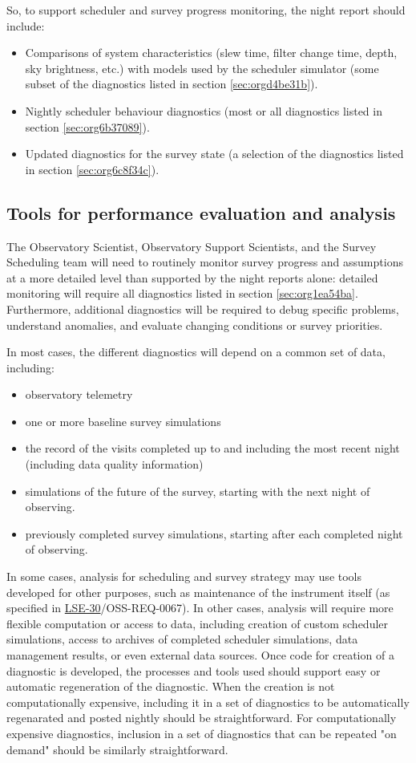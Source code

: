 So, to support scheduler and survey progress monitoring, the night report should include:
\begin{itemize}
\item Comparisons of system characteristics (slew time, filter change time, depth, sky brightness, etc.) with models used by the scheduler simulator (some subset of the diagnostics listed in section \ref{sec:orgd4be31b}).
\item Nightly scheduler behaviour diagnostics (most or all diagnostics listed in section \ref{sec:org6b37089}).
\item Updated diagnostics for the survey state (a selection of the diagnostics listed in section \ref{sec:org6c8f34c}).
\end{itemize}

\subsection{Tools for performance evaluation and analysis}
\label{sec:org032ab78}
The Observatory Scientist, Observatory Support Scientists, and the Survey Scheduling team will need to routinely monitor survey progress and assumptions at a more detailed level than supported by the night reports alone:
detailed monitoring will require all diagnostics listed in section \ref{sec:org1ea54ba}.
Furthermore, additional diagnostics will be required to debug specific problems, understand anomalies, and evaluate changing conditions or survey priorities.

In most cases, the different diagnostics will depend on a common set of data, including:
\begin{itemize}
\item observatory telemetry
\item one or more baseline survey simulations
\item the record of the visits completed up to and including the most recent night (including data quality information)
\item simulations of the future of the survey, starting with the next night of observing.
\item previously completed survey simulations, starting after each completed night of observing.
\end{itemize}

In some cases, analysis for scheduling and survey strategy may use tools developed for other purposes, such as maintenance of the instrument itself (as specified in \href{https://ls.st/lse-30}{LSE-30}/OSS-REQ-0067).
In other cases, analysis will require more flexible computation or access to data, including creation of custom scheduler simulations, access to archives of completed scheduler simulations, data management results, or even external data sources.
Once code for creation of a diagnostic is developed, the processes and tools used should support easy or automatic regeneration of the diagnostic.
When the creation is not computationally expensive, including it in a set of diagnostics to be automatically regenarated and posted nightly should be straightforward.
For computationally expensive diagnostics, inclusion in a set of diagnostics that can be repeated "on demand" should be similarly straightforward.


